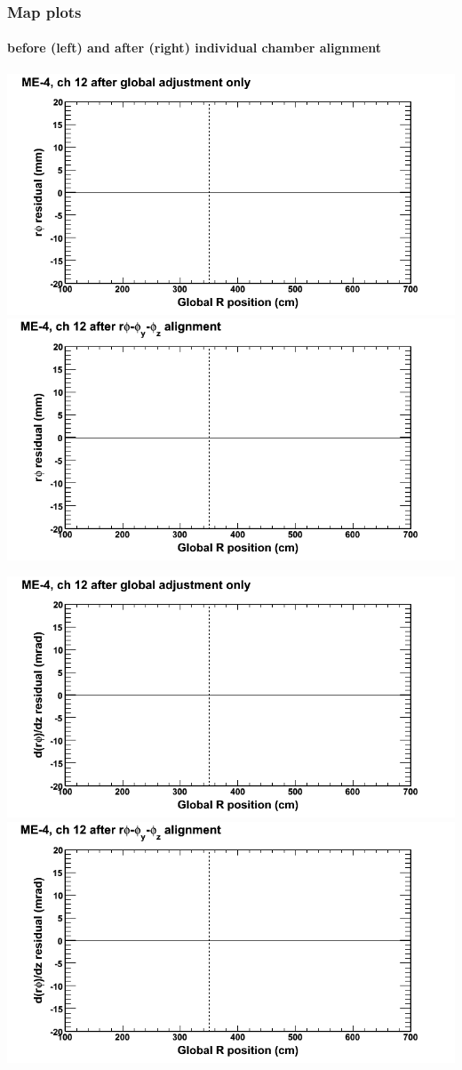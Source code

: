 \documentclass[compress]{beamer}
\begin{document}
\begin{frame}
\frametitle{Map plots}
\framesubtitle{before (left) and after (right) individual chamber alignment}
\includegraphics[width=0.5\linewidth]{ringmapplots_3dof/before_CSCvsr_mem4ch12_x.png} \includegraphics[width=0.5\linewidth]{ringmapplots_3dof/after_CSCvsr_mem4ch12_x.png}

\includegraphics[width=0.5\linewidth]{ringmapplots_3dof/before_CSCvsr_mem4ch12_dxdz.png} \includegraphics[width=0.5\linewidth]{ringmapplots_3dof/after_CSCvsr_mem4ch12_dxdz.png}
\end{frame}
\end{document}
